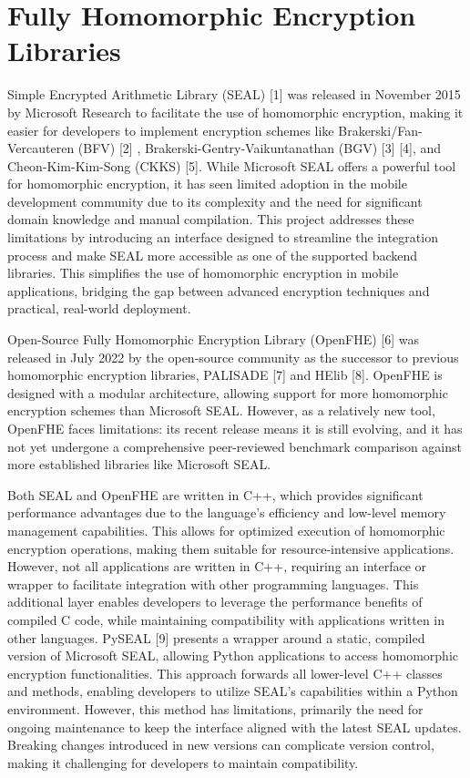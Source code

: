 \section{Fully Homomorphic Encryption Libraries}

Simple Encrypted Arithmetic Library (SEAL) [1] was released in November 2015 by Microsoft Research to facilitate the use of homomorphic encryption, making it easier for developers to implement encryption schemes like Brakerski/Fan-Vercauteren (BFV) [2] , Brakerski-Gentry-Vaikuntanathan (BGV) [3] [4], and Cheon-Kim-Kim-Song (CKKS) [5]. While Microsoft SEAL offers a powerful tool for homomorphic encryption, it has seen limited adoption in the mobile development community due to its complexity and the need for significant domain knowledge and manual compilation. This project addresses these limitations by introducing an interface designed to streamline the integration process and make SEAL more accessible as one of the supported backend libraries. This simplifies the use of homomorphic encryption in mobile applications, bridging the gap between advanced encryption techniques and practical, real-world deployment.

Open-Source Fully Homomorphic Encryption Library (OpenFHE) [6] was released in July 2022 by the open-source community as the successor to previous homomorphic encryption libraries, PALISADE [7] and HElib [8]. OpenFHE is designed with a modular architecture, allowing support for more homomorphic encryption schemes than Microsoft SEAL. However, as a relatively new tool, OpenFHE faces limitations: its recent release means it is still evolving, and it has not yet undergone a comprehensive peer-reviewed benchmark comparison against more established libraries like Microsoft SEAL.

Both SEAL and OpenFHE are written in C++, which provides significant performance advantages due to the language’s efficiency and low-level memory management capabilities. This allows for optimized execution of homomorphic encryption operations, making them suitable for resource-intensive applications. However, not all applications are written in C++, requiring an interface or wrapper to facilitate integration with other programming languages. This additional layer enables developers to leverage the performance benefits of compiled C code, while maintaining compatibility with applications written in other languages.
PySEAL [9] presents a wrapper around a static, compiled version of Microsoft SEAL, allowing Python applications to access homomorphic encryption functionalities. This approach forwards all lower-level C++ classes and methods, enabling developers to utilize SEAL's capabilities within a Python environment. However, this method has limitations, primarily the need for ongoing maintenance to keep the interface aligned with the latest SEAL updates. Breaking changes introduced in new versions can complicate version control, making it challenging for developers to maintain compatibility.


